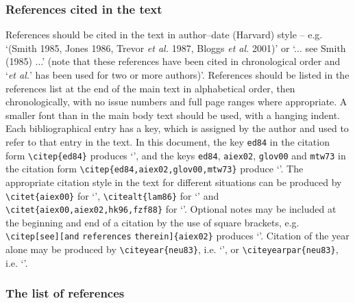 \documentclass[]{tRSL2e}
\begin{document}
\subsubsection{References cited in the text} References should be cited in the text in
author--date (Harvard) style -- e.g. `(Smith 1985, Jones 1986, Trevor {\itshape{et al.}} 1987, Bloggs
{\itshape{et al.}} 2001)' or `... see Smith (1985) ...' (note that these references have been cited in
chronological order and `{\itshape{et al.}}' has been used for two or more authors)'. References should be
listed in the references list at the end of the main text in alphabetical order, then chronologically, with no
issue numbers and full page ranges where appropriate. A smaller font than in the main body text should be used,
with a hanging indent. Each bibliographical entry has a key, which is assigned by the author and used to refer
to that entry in the text. In this document, the key \verb"ed84" in the citation form \verb"\citep{ed84}"
produces `\citep{ed84}', and the keys \verb"ed84", \verb"aiex02", \verb"glov00" and \verb"mtw73" in the citation
form \verb"\citep{ed84,aiex02,glov00,mtw73}" produce `\citep{ed84,aiex02,glov00,mtw73}'. The appropriate
citation style in the text for different situations can be produced by \verb"\citet{aiex00}" for
`\citet{aiex00}', \verb"\citealt{lam86}" for `\citealt{lam86}' and \verb"\citet{aiex00,aiex02,hk96,fzf88}" for
`\citet{aiex00,aiex02,hk96,fzf88}'. Optional notes may be included at the beginning and end of a citation by the
use of square brackets, e.g. \verb"\citep[see][and" \verb"references" \verb"therein]{aiex02}" produces
`\citep[see][and references therein]{aiex02}'. Citation of the year alone may be produced by
\verb"\citeyear{neu83}", i.e. `\citeyear{neu83}', or \verb"\citeyearpar{neu83}", i.e. `\citeyearpar{neu83}'.

\subsubsection{The list of references}
\end{document}
